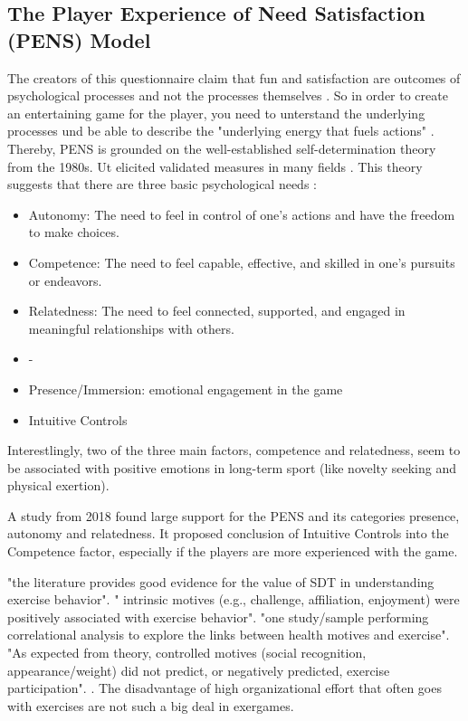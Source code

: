 \subsection{The Player Experience of Need Satisfaction (PENS) Model}
The creators of this questionnaire claim that fun and satisfaction are outcomes of psychological processes and not the processes themselves \cite{rigby2007player}. So in order to create an entertaining game for the player, you need to unterstand the underlying processes und be able to describe the "underlying energy that fuels actions" \cite{rigby2007player}. Thereby, PENS is grounded on the well-established self-determination theory from the 1980s. Ut elicited validated measures in many fields \cite{pietrabissa2020development,lohmann2017measuring,richards2021further}. This theory suggests that there are three basic psychological needs \cite{deci1985intrinsic}:
\begin{itemize}
	\item Autonomy: The need to feel in control of one's actions and have the freedom to make choices.
	\item Competence: The need to feel capable, effective, and skilled in one's pursuits or endeavors.
	\item Relatedness: The need to feel connected, supported, and engaged in meaningful relationships with others.
	\item -
	\item Presence/Immersion: emotional engagement in the game
	\item Intuitive Controls
\end{itemize}

Interestlingly, two of the three main factors, competence and relatedness, seem to be associated with positive emotions in long-term sport \cite{wienke2016qualitative} (like novelty seeking and physical exertion).

A study from 2018 found large support for the PENS \cite{johnson2018validation} and its categories presence, autonomy and relatedness. It proposed conclusion of Intuitive Controls into the Competence factor, especially if the players are more experienced with the game.

"the literature provides good evidence for the value of SDT in understanding exercise behavior". " intrinsic motives (e.g., challenge, affiliation, enjoyment) were positively associated with exercise behavior". "one study/sample performing correlational analysis to explore the links between health motives and exercise". "As expected from theory, controlled motives (social recognition, appearance/weight) did not predict, or negatively predicted, exercise participation". \cite{teixeira2012exercise}.
The disadvantage of high organizational effort that often goes with exercises \cite{mullan97variations} are not such a big deal in exergames.


